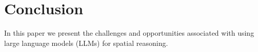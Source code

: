 \section{Conclusion}
\label{section:conclusion}
\normalsize


In this paper we present the challenges and opportunities associated with using large language models (LLMs) for spatial reasoning.